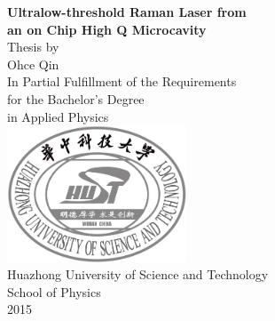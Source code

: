 \begin{titlepage}
\centering
\textbf{{\huge Ultralow-threshold Raman Laser from}}\\[0.3cm]
\textbf{{\huge an on Chip High Q Microcavity}}\\[2.5cm]
\large Thesis by\\[0.3cm]
{\Large Ohce Qin}\\[1.5cm]
In Partial Fulfillment of the Requirements\\[0.3cm]
for the Bachelor's Degree\\[0.3cm]
in Applied Physics\\[4cm]
\includegraphics[width = 0.4\textwidth]{HUST.png}~\\[1.5cm]
Huazhong University of Science and Technology\\[0.5cm]
School of Physics\\[1cm]
2015
\end{titlepage}
